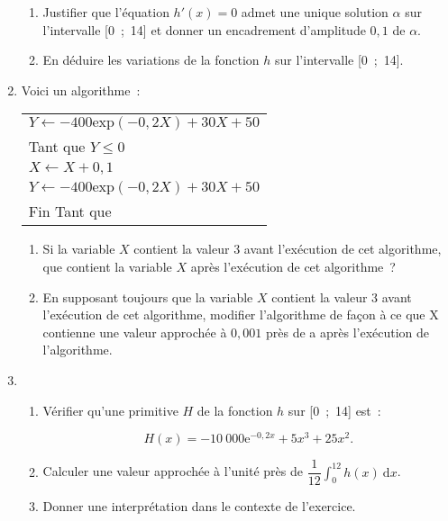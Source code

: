 \begin{enumerate}
               \begin{enumerate}[label=\alph*.]
                    \item Justifier que l'équation $h'(x)= 0$ admet une unique solution $\alpha$ sur l'intervalle [0~;~14] et donner un encadrement d'amplitude $0,1$ de $\alpha$.
                    \item  En déduire les variations de la fonction $h$ sur l'intervalle [0~;~14].
               \end{enumerate}
               \item Voici un algorithme~:
               \begin{center}
\begin{extern}%
                                   \begin{tabularx}{0.5\linewidth}{|X|}\hline
                         $Y \gets -400 \text{exp}(- 0,2X) + 30X + 50$\\
                         Tant que $Y \leqslant 0$\\
                         \hspace{0.7cm}$X \gets X + 0,1$\\
                         \hspace{0.7cm}$Y \gets  -400 \text{exp}(- 0,2X)+ 30X +50$\\
                         Fin Tant que\\ \hline
                    \end{tabularx}

               \end{extern}
                              \end{center}
               \begin{enumerate}[label=\alph*.]
                    \item Si la variable $X$ contient la valeur 3 avant l'exécution de cet algorithme, que contient la variable $X$ après l'exécution de cet algorithme~?
                    \item En supposant toujours que la variable $X$ contient la valeur $3$ avant l'exécution de cet algorithme, modifier l'algorithme de façon à ce que X contienne une valeur approchée à $0,001$ près de a après l'exécution de l'algorithme.
               \end{enumerate}
               \item
               \begin{enumerate}[label=\alph*.]
                    \item Vérifier qu'une primitive $H$ de la fonction $h$ sur [0~;~14] est~:
                    \par
                    \[H(x) = - 10~000 \text{e}^{- 0,2x} + 5x^3 + 25x^2.\]
                    \item  Calculer une valeur approchée à l'unité près de
                    $\dfrac{1}{12} \displaystyle\int_0^{12}  h(x)\:\text{d}x$.
                    \item  Donner une interprétation dans le contexte de l'exercice.
               \end{enumerate}
          \end{enumerate}
